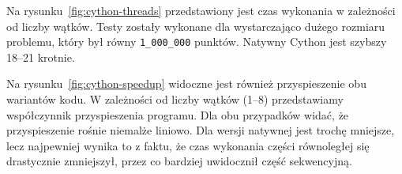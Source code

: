 \begin{figure*}
    \centering
    \begin{minipage}[b]{.45\textwidth}
        \centering
        
        \caption{Czas wykonania algorytmu w Cythonie w zależności od liczby wątków}
        \label{fig:cython-threads}
    \end{minipage}
    \hfill
    \begin{minipage}[b]{.45\textwidth}
        \centering
        
        \caption{Przyspieszenie liczenia liczby $\pi$ w Cythonie}
        \label{fig:cython-speedup}
    \end{minipage}
\end{figure*}

Na rysunku~\ref{fig:cython-threads} przedstawiony jest czas wykonania
w zależności od liczby wątków.
Testy zostały wykonane dla wystarczająco dużego rozmiaru problemu,
który był równy \texttt{1\_000\_000} punktów.
Natywny Cython jest szybszy 18--21 krotnie.

Na rysunku~\ref{fig:cython-speedup} widoczne jest również przyspieszenie
obu wariantów kodu.
W zależności od liczby wątków (1--8) przedstawiamy współczynnik
przyspieszenia programu.
Dla obu przypadków widać, że przyspieszenie rośnie niemalże liniowo.
Dla wersji natywnej jest trochę mniejsze, lecz najpewniej wynika to z faktu,
że czas wykonania części równoległej się drastycznie zmniejszył,
przez co bardziej uwidocznił część sekwencyjną.


